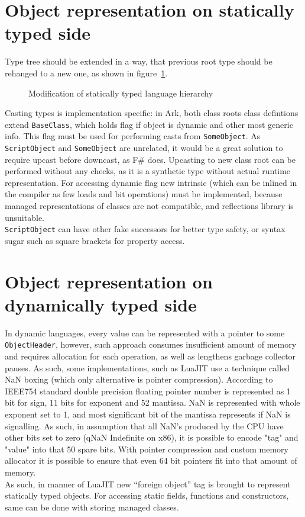 \documentclass[times,specification,annotation]{itmo-student-thesis}
\begin{document}
\section{Object representation on statically typed side}
Type tree should be extended in a way, that previous root type should be rehanged to a new one, as shown in figure~\ref{fig:statically-typed-tree}.
\begin{figure}[!h]
	\caption{Modification of statically typed language hierarchy}\label{fig:statically-typed-tree}
	\centering
	
\end{figure}
Casting types is implementation specific: in Ark, both class roots class defintions extend \texttt{BaseClass}, which holds flag if object is dynamic and other most generic info. This flag must be used for performing casts from \texttt{SomeObject}. As \texttt{ScriptObject} and \texttt{SomeObject} are unrelated, it would be a great solution to require upcast before downcast, as F\# does. Upcasting to new class root can be performed without any checks, as it is a synthetic type without actual runtime representation. For accessing dynamic flag new intrinsic (which can be inlined in the compiler as few loads and bit operations) must be implemented, because managed representations of classes are not compatible, and reflections library is unsuitable.\\
\texttt{ScriptObject} can have other fake successors for better type safety, or syntax sugar such as square brackets for property access.\\

\section{Object representation on dynamically typed side}
In dynamic languages, every value can be represented with a pointer to some \texttt{ObjectHeader}, however, such approach consumes insufficient amount of memory and requires allocation for each operation, as well as lengthens garbage collector pauses. As such, some implementations, such as LuaJIT use a technique called NaN boxing (which only alternative is pointer compression). According to IEEE754 standard double precision floating pointer number is represented as 1 bit for sign, 11 bits for exponent and 52 mantissa. NaN is represented with whole exponent set to 1, and most significant bit of the mantissa represents if NaN is signalling. As such, in assumption that all NaN's produced by the CPU have other bits set to zero (qNaN Indefinite on x86), it is possible to encode "tag" and "value" into that 50 spare bits. With pointer compression and custom memory allocator it is possible to ensure that even 64 bit pointers fit into that amount of memory.\\
As such, in manner of LuaJIT new ``foreign object'' tag is brought to represent statically typed objects. For accessing static fields, functions and constructors, same can be done with storing managed classes.
\end{document}
